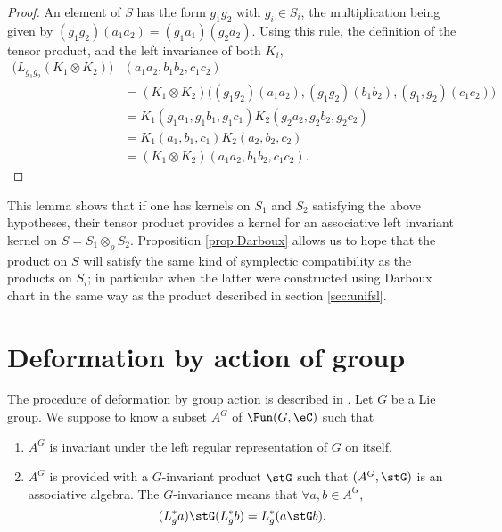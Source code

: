 \begin{proof}
An element of $S$ has the form $g_1g_2$ with $g_i\in S_i$, the multiplication being given by $(g_1g_2)(a_1a_2)=(g_1a_1)(g_2a_2)$. Using this rule, the definition of the tensor product, and the left invariance of both $K_i$,
\[ 
\begin{split}
\big( L_{g_1g_2}(K_1\otimes K_2) \big)&(a_1a_2,b_1b_2,c_1c_2)\\
            &=(K_1\otimes K_2)\big( (g_1g_2)(a_1a_2),(g_1g_2)(b_1b_2),(g_1,g_2)(c_1c_2) \big)\\
            &=K_1(g_1a_1,g_1b_1,g_1c_1)K_2(g_2a_2,g_2b_2,g_2c_2)\\
            &=K_1(a_1,b_1,c_1)K_2(a_2,b_2,c_2)\\
            &=(K_1\otimes K_2)(a_1a_2,b_1b_2,c_1c_2).
\end{split}  
\]

\end{proof}

This lemma shows that if one has kernels on $S_1$ and $S_2$ satisfying the above hypotheses, their tensor product provides a kernel for an associative left invariant kernel on $S=S_1\otimes_{\rho} S_2$.  Proposition \ref{prop:Darboux} allows us to hope that the product on $S$ will satisfy the same kind of symplectic compatibility as the products on $S_i$; in particular when the latter were constructed using Darboux chart in the same way as the product described in section  \ref{sec:unifsl}.

\section{Deformation by action of group}    \label{SecDefAction}        %

The procedure of deformation by group action is described in \cite{TrsStProd}. Let $G$ be a Lie group. We suppose to know a subset $A^G$ of $\Fun(G,\eC)$  such that
\begin{enumerate}
\item $A^G$ is invariant under the left regular representation of $G$ on itself,
\item $A^G$ is provided with a $G$-invariant product $\stG$ such that $(A^G,\stG)$ is an associative algebra. The $G$-invariance means that $\forall a,b\in A^G$,
\[
    (L^*_ga)\stG(L^*_gb)=L^*_g(a\stG b).
\]
\end{enumerate}

